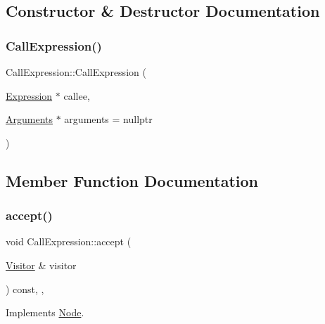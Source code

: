 \subsection{Constructor \& Destructor Documentation}
\mbox{\label{struct_call_expression_a7e6da0437a5f82430af5f31779b830d7}} 
\subsubsection{\texorpdfstring{Call\+Expression()}{CallExpression()}}
{\footnotesize\ttfamily Call\+Expression\+::\+Call\+Expression (\begin{DoxyParamCaption}\item[{\hyperlink{struct_expression}{Expression} $\ast$}]{callee,  }\item[{\hyperlink{struct_arguments}{Arguments} $\ast$}]{arguments = {\ttfamily nullptr} }\end{DoxyParamCaption})\hspace{0.3cm}{\ttfamily [inline]}}



\subsection{Member Function Documentation}
\mbox{\label{struct_call_expression_a5be626b61944a97f2a6015b632432513}} 
\subsubsection{\texorpdfstring{accept()}{accept()}}
{\footnotesize\ttfamily void Call\+Expression\+::accept (\begin{DoxyParamCaption}\item[{\hyperlink{struct_visitor}{Visitor} \&}]{visitor }\end{DoxyParamCaption}) const\hspace{0.3cm}{\ttfamily [inline]}, {\ttfamily [override]}, {\ttfamily [virtual]}}



Implements \hyperlink{struct_node_a10bd7af968140bbf5fa461298a969c71}{Node}.



